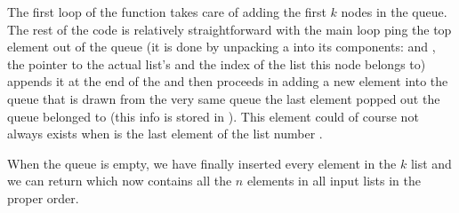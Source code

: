 The first loop of the function takes care of adding the first $k$ nodes in the queue.
The rest of the code is relatively straightforward with the main  loop ping the top element out of the queue (it is done by unpacking a  into its components:  and , the pointer to the actual list's  and the index of the list this node belongs to) appends it at the end of the  and then proceeds in adding a new element into the queue that is drawn from the very same queue the last element popped out the queue belonged to (this info is stored in ). This element could of course not always exists when  is the last element of the list number .

When the queue is empty, we have finally inserted every element in the $k$ list and we can return  which now contains all the $n$ elements in all input lists in the proper order.


